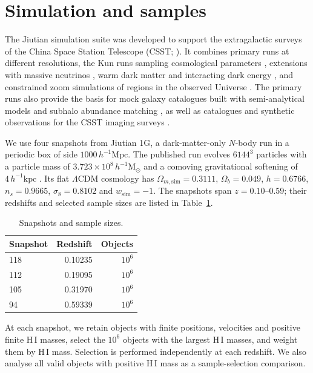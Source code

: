 \section{Simulation and samples}\label{sec:data}
The Jiutian simulation suite was developed to support the extragalactic surveys of the China Space Station Telescope (CSST; \citealt{Jiutian2025Overview}). It combines primary runs at different resolutions, the Kun runs sampling cosmological parameters \citep{Chen2025Kun}, extensions with massive neutrinos \citep{Chen2025Neutrinos,Yu2026CUBE2}, warm dark matter \citep{He2023WarmDM} and interacting dark energy \citep{Zhang2019IDE}, and constrained zoom simulations of regions in the observed Universe \citep{Luo2024ELUCID}. The primary runs also provide the basis for mock galaxy catalogues built with semi-analytical models \citep{Pei2024Emission,Tan2026GAEA} and subhalo abundance matching \citep{Gu2024SHAM}, as well as catalogues and synthetic observations for the CSST imaging surveys \citep{Wei2026MockCatalog,Wei2026Framework}.

We use four snapshots from Jiutian 1G, a dark-matter-only $N$-body run in a periodic box of side $1000\,h^{-1}\mathrm{Mpc}$. The published run evolves $6144^3$ particles with a particle mass of $3.723\times10^8\,h^{-1}\mathrm{M}_{\odot}$ and a comoving gravitational softening of $4\,h^{-1}\mathrm{kpc}$ \citep{Jiutian2025Overview}. Its flat $\Lambda$CDM cosmology has $\Omega_{m,\mathrm{sim}}=0.3111$, $\Omega_b=0.049$, $h=0.6766$, $n_s=0.9665$, $\sigma_8=0.8102$ and $w_{\mathrm{sim}}=-1$. The snapshots span $z=0.10$--$0.59$; their redshifts and selected sample sizes are listed in Table~\ref{tab:snapshots}. 

\begin{table}
\centering
\caption{Snapshots and sample sizes.}
\label{tab:snapshots}
\begin{tabular}{@{}lrr@{}}
\toprule
Snapshot & Redshift & Objects \\
\midrule
118 & 0.10235 & $10^6$ \\
112 & 0.19095 & $10^6$ \\
105 & 0.31970 & $10^6$ \\
94 & 0.59339 & $10^6$ \\
\bottomrule
\end{tabular}
\end{table}

At each snapshot, we retain objects with finite positions, velocities and positive finite H\,I masses, select the $10^6$ objects with the largest H\,I masses, and weight them by H\,I mass. Selection is performed independently at each redshift. We also analyse all valid objects with positive H\,I mass as a sample-selection comparison.
